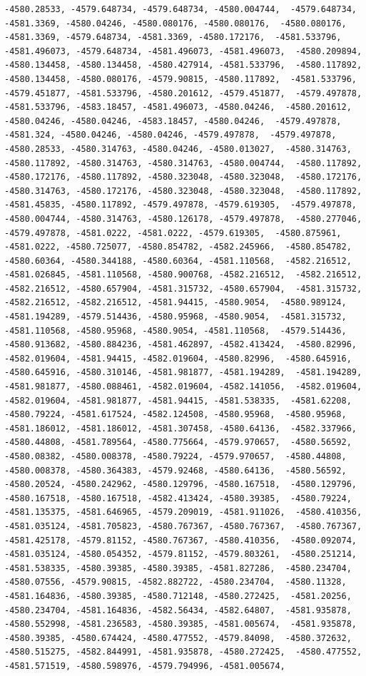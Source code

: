 \documentclass[
]{article}
\begin{document}
\begin{verbatim}
-4580.28533, -4579.648734, -4579.648734, -4580.004744,  -4579.648734, -4581.3369, -4580.04246, -4580.080176, -4580.080176,  -4580.080176, -4581.3369, -4579.648734, -4581.3369, -4580.172176,  -4581.533796, -4581.496073, -4579.648734, -4581.496073, -4581.496073,  -4580.209894, -4580.134458, -4580.134458, -4580.427914, -4581.533796,  -4580.117892, -4580.134458, -4580.080176, -4579.90815, -4580.117892,  -4581.533796, -4579.451877, -4581.533796, -4580.201612, -4579.451877,  -4579.497878, -4581.533796, -4583.18457, -4581.496073, -4580.04246,  -4580.201612, -4580.04246, -4580.04246, -4583.18457, -4580.04246,  -4579.497878, -4581.324, -4580.04246, -4580.04246, -4579.497878,  -4579.497878, -4580.28533, -4580.314763, -4580.04246, -4580.013027,  -4580.314763, -4580.117892, -4580.314763, -4580.314763, -4580.004744,  -4580.117892, -4580.172176, -4580.117892, -4580.323048, -4580.323048,  -4580.172176, -4580.314763, -4580.172176, -4580.323048, -4580.323048,  -4580.117892, -4581.45835, -4580.117892, -4579.497878, -4579.619305,  -4579.497878, -4580.004744, -4580.314763, -4580.126178, -4579.497878,  -4580.277046, -4579.497878, -4581.0222, -4581.0222, -4579.619305,  -4580.875961, -4581.0222, -4580.725077, -4580.854782, -4582.245966,  -4580.854782, -4580.60364, -4580.344188, -4580.60364, -4581.110568,  -4582.216512, -4581.026845, -4581.110568, -4580.900768, -4582.216512,  -4582.216512, -4582.216512, -4580.657904, -4581.315732, -4580.657904,  -4581.315732, -4582.216512, -4582.216512, -4581.94415, -4580.9054,  -4580.989124, -4581.194289, -4579.514436, -4580.95968, -4580.9054,  -4581.315732, -4581.110568, -4580.95968, -4580.9054, -4581.110568,  -4579.514436, -4580.913682, -4580.884236, -4581.462897, -4582.413424,  -4580.82996, -4582.019604, -4581.94415, -4582.019604, -4580.82996,  -4580.645916, -4580.645916, -4580.310146, -4581.981877, -4581.194289,  -4581.194289, -4581.981877, -4580.088461, -4582.019604, -4582.141056,  -4582.019604, -4582.019604, -4581.981877, -4581.94415, -4581.538335,  -4581.62208, -4580.79224, -4581.617524, -4582.124508, -4580.95968,  -4580.95968, -4581.186012, -4581.186012, -4581.307458, -4580.64136,  -4582.337966, -4580.44808, -4581.789564, -4580.775664, -4579.970657,  -4580.56592, -4580.08382, -4580.008378, -4580.79224, -4579.970657,  -4580.44808, -4580.008378, -4580.364383, -4579.92468, -4580.64136,  -4580.56592, -4580.20524, -4580.242962, -4580.129796, -4580.167518,  -4580.129796, -4580.167518, -4580.167518, -4582.413424, -4580.39385,  -4580.79224, -4581.135375, -4581.646965, -4579.209019, -4581.911026,  -4580.410356, -4581.035124, -4581.705823, -4580.767367, -4580.767367,  -4580.767367, -4581.425178, -4579.81152, -4580.767367, -4580.410356,  -4580.092074, -4581.035124, -4580.054352, -4579.81152, -4579.803261,  -4580.251214, -4581.538335, -4580.39385, -4580.39385, -4581.827286,  -4580.234704, -4580.07556, -4579.90815, -4582.882722, -4580.234704,  -4580.11328, -4581.164836, -4580.39385, -4580.712148, -4580.272425,  -4581.20256, -4580.234704, -4581.164836, -4582.56434, -4582.64807,  -4581.935878, -4580.552998, -4581.236583, -4580.39385, -4581.005674,  -4581.935878, -4580.39385, -4580.674424, -4580.477552, -4579.84098,  -4580.372632, -4580.515275, -4582.844991, -4581.935878, -4580.272425,  -4580.477552, -4581.571519, -4580.598976, -4579.794996, -4581.005674, 
\end{verbatim}
\end{document}
